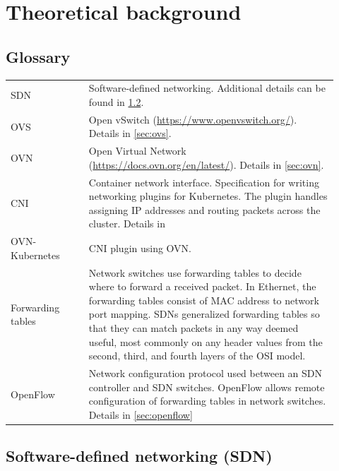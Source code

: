 \chapter{Theoretical background}
\label{chap:refs}

\section{Glossary}

\begin{tabular}{p{0.22\linewidth}p{0.7\linewidth}}
    SDN & Software-defined networking. Additional details can be found in \cref{sec:sdn}. \\ %

    OVS & Open vSwitch (\url{https://www.openvswitch.org/}). Details in \cref{sec:ovs}. \\ %

    OVN & Open Virtual Network (\url{https://docs.ovn.org/en/latest/}). Details in \cref{sec:ovn}. \\ %

    CNI & Container network interface\tablefootnote{\url{https://github.com/containernetworking/cni/blob/dc0779e8cec8bfe39bc0d7a038250e233e5214eb/SPEC.md}}. Specification for writing networking plugins for Kubernetes. The plugin handles assigning IP addresses and routing packets across the cluster. Details in \\

    OVN-Kubernetes & CNI plugin using OVN. \\

    Forwarding tables & Network switches use forwarding tables to decide where to forward a received packet. In Ethernet, the forwarding tables consist of MAC address to network port mapping. SDNs generalized forwarding tables so that they can match packets in any way deemed useful, most commonly on any header values from the second, third, and fourth layers of the OSI model. \\

    OpenFlow & Network configuration protocol used between an SDN controller and SDN switches. OpenFlow allows remote configuration of forwarding tables in network switches. Details in \cref{sec:openflow}

\end{tabular}

\section{Software-defined networking (SDN)}
\label{sec:sdn}

